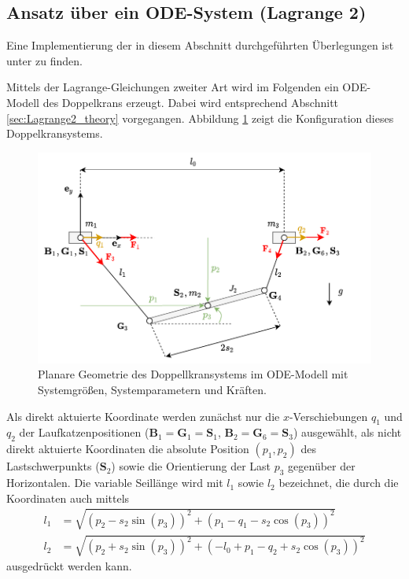 \subsection{Ansatz über ein ODE-System (Lagrange 2)}
\label{subsec:double_crane_lagrange2}
Eine Implementierung der in diesem Abschnitt durchgeführten Überlegungen ist unter \cite[flatness\_notebooks/ODE\_flatness\_analysis.ipynb]{SAGithub} zu finden.

Mittels der Lagrange-Gleichungen zweiter Art wird im Folgenden ein ODE-Modell des Doppelkrans erzeugt. Dabei wird entsprechend Abschnitt \ref{sec:Lagrange2_theory} vorgegangen. Abbildung \ref{fig:double_crane_diagram} zeigt die Konfiguration dieses Doppelkransystems.

\begin{figure}[ht]
	\begin{center}
		\includegraphics[scale=1]{Pictures/ODE_flatness_analysis_double_crane_diagram}
	\end{center}
	\caption[Planare Geometrie des Doppellkransystems im ODE-Modell]
	{Planare Geometrie des Doppellkransystems im ODE-Modell mit Systemgrößen, Systemparametern und Kräften.}
	\label{fig:double_crane_diagram}
\end{figure}


Als direkt aktuierte Koordinate werden zunächst nur die $x$-Verschiebungen $q_1$ und $q_2$ der Laufkatzenpositionen ($\mathbf{B}_1 = \mathbf{G}_1 = \mathbf{S}_1$, $\mathbf{B}_2 = \mathbf{G}_6 = \mathbf{S}_3$) ausgewählt, als nicht direkt aktuierte Koordinaten die absolute Position $(p_1, p_2)$ des Lastschwerpunkts ($\mathbf{S}_2$) sowie die Orientierung der Last $p_3$ gegenüber der Horizontalen. Die variable Seillänge wird mit $l_1$ sowie $l_2$ bezeichnet, die durch die Koordinaten auch mittels
\begin{align}
l_1 &= \sqrt{\left(p_{2} - s_{2} \sin{\left(p_{3} \right)}\right)^{2} + \left(p_{1} - q_{1} - s_{2} \cos{\left(p_{3} \right)}\right)^{2}} \\
l_2 &= \sqrt{\left(p_{2} + s_{2} \sin{\left(p_{3} \right)}\right)^{2} + \left(- l_{0} + p_{1} - q_{2} + s_{2} \cos{\left(p_{3} \right)}\right)^{2}}
\end{align}
ausgedrückt werden kann.

